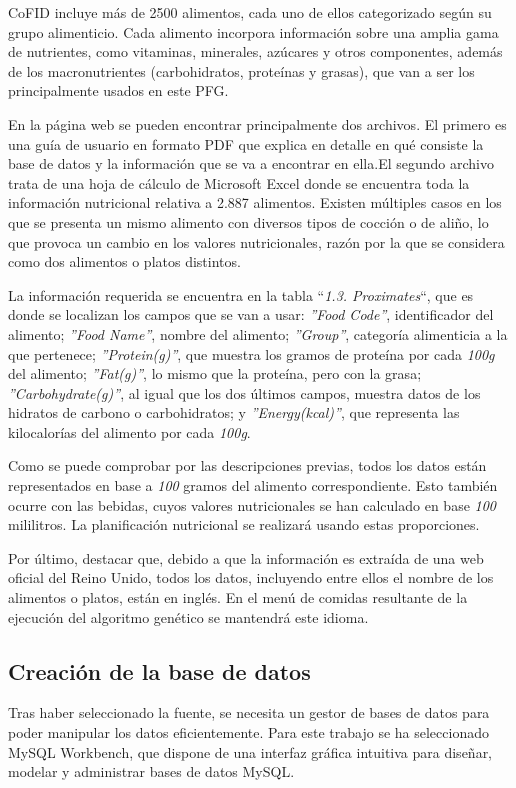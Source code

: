 CoFID incluye más de 2500 alimentos, cada uno de ellos categorizado según su grupo alimenticio. Cada alimento incorpora información sobre una amplia gama de nutrientes, como vitaminas, minerales, azúcares y otros componentes, además de los macronutrientes (carbohidratos, proteínas y grasas), que van a ser los principalmente usados en este PFG.

En la página web se pueden encontrar principalmente dos archivos. El primero es una guía de usuario en formato PDF que explica en detalle en qué consiste la base de datos y la información que se va a encontrar en ella.\newpage El segundo archivo trata de una hoja de cálculo de Microsoft Excel donde se encuentra toda la información nutricional relativa a 2.887 alimentos. Existen múltiples casos en los que se presenta un mismo alimento con diversos tipos de cocción o de aliño, lo que provoca un cambio en los valores nutricionales, razón por la que se considera como dos alimentos o platos distintos.

La información requerida se encuentra en la tabla ``\textit{1.3. Proximates}``, que es donde se localizan los campos que se van a usar: \textit{''Food Code''}, identificador del alimento; \textit{''Food Name''}, nombre del alimento; \textit{''Group''}, categoría alimenticia a la que pertenece; \textit{''Protein(g)''}, que muestra los gramos de proteína por cada \textit{100g} del alimento; \textit{''Fat(g)''}, lo mismo que la proteína, pero con la grasa; \textit{''Carbohydrate(g)''}, al igual que los dos últimos campos, muestra datos de los hidratos de carbono o carbohidratos; y \textit{''Energy(kcal)''}, que representa las kilocalorías del alimento por cada \textit{100g}.

Como se puede comprobar por las descripciones previas, todos los datos están representados en base a \textit{100} gramos del alimento correspondiente. Esto también ocurre con las bebidas, cuyos valores nutricionales se han calculado en base \textit{100} mililitros. La planificación nutricional se realizará usando estas proporciones.

Por último, destacar que, debido a que la información es extraída de una web oficial del Reino Unido, todos los datos, incluyendo entre ellos el nombre de los alimentos o platos, están en inglés. En el menú de comidas resultante de la ejecución del algoritmo genético se mantendrá este idioma.

\subsection{Creación de la base de datos}
Tras haber seleccionado la fuente, se necesita un gestor de bases de datos para poder manipular los datos eficientemente. Para este trabajo se ha seleccionado MySQL Workbench, que dispone de una interfaz gráfica intuitiva para diseñar, modelar y administrar bases de datos MySQL.~\cite{mysqlworkbench}


